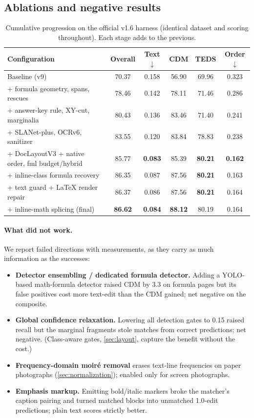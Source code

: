 \subsection{Ablations and negative results}
\label{sec:ablations}

\begin{table}[t]
\centering
\caption{Cumulative progression on the official v1.6 harness (identical dataset and scoring throughout). Each stage adds to the previous.}
\label{tab:ablation}
\small
\setlength{\tabcolsep}{4pt}
\begin{tabular}{lccccc}
\toprule
Configuration & Overall & Text$\downarrow$ & CDM & TEDS & Order$\downarrow$ \\
\midrule
Baseline (v9) & 70.37 & 0.158 & 56.90 & 69.96 & 0.323 \\
+ formula geometry, spans, rescues & 78.46 & 0.142 & 78.11 & 71.46 & 0.286 \\
+ answer-key rule, XY-cut, marginalia & 80.43 & 0.136 & 83.46 & 71.40 & 0.241 \\
+ SLANet-plus, OCRv6, sanitizer & 83.55 & 0.120 & 83.84 & 78.83 & 0.238 \\
+ DocLayoutV3 + native order, fml budget/hybrid & 85.77 & \textbf{0.083} & 85.39 & \textbf{80.21} & \textbf{0.162} \\
+ inline-class formula recovery & 86.35 & 0.087 & 87.56 & \textbf{80.21} & 0.163 \\
+ text guard + \LaTeX{} render repair & 86.37 & 0.086 & 87.56 & \textbf{80.21} & 0.164 \\
+ inline-math splicing (final) & \textbf{86.62} & \textbf{0.084} & \textbf{88.12} & 80.19 & 0.164 \\
\bottomrule
\end{tabular}
\end{table}

\paragraph{What did not work.} We report failed directions with measurements, as they carry as much information as the successes:
\begin{itemize}
\item \textbf{Detector ensembling / dedicated formula detector.} Adding a YOLO-based math-formula detector raised CDM by 3.3 on formula pages but its false positives cost more text-edit than the CDM gained; net negative on the composite.
\item \textbf{Global confidence relaxation.} Lowering all detection gates to 0.15 raised recall but the marginal fragments stole matches from correct predictions; net negative. (Class-aware gates, \cref{sec:layout}, capture the benefit without the cost.)
\item \textbf{Frequency-domain moir\'e removal} erases text-line frequencies on paper photographs (\cref{sec:normalization}); enabled only for screen photographs.
\item \textbf{Emphasis markup.} Emitting bold/italic markers broke the matcher's caption pairing and turned matched blocks into unmatched 1.0-edit predictions; plain text scores strictly better.
\end{itemize}

